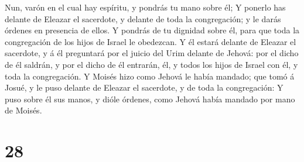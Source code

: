 Nun, varón en el cual hay espíritu, y pondrás tu mano sobre él;
 Y ponerlo has delante de Eleazar el sacerdote, y delante
de toda la congregación; y le darás órdenes en presencia de ellos.
 Y pondrás de tu dignidad sobre él, para que toda la
congregación de los hijos de Israel le obedezcan.  Y él
estará delante de Eleazar el sacerdote, y á él preguntará por el juicio
del Urim delante de Jehová: por el dicho de él saldrán, y por el dicho
de él entrarán, él, y todos los hijos de Israel con él, y toda la
congregación.  Y Moisés hizo como Jehová le había
mandado; que tomó á Josué, y le puso delante de Eleazar el sacerdote, y
de toda la congregación:  Y puso sobre él sus manos, y
dióle órdenes, como Jehová había mandado por mano de Moisés.

\hypertarget{section-27}{%
\section{28}\label{section-27}}

